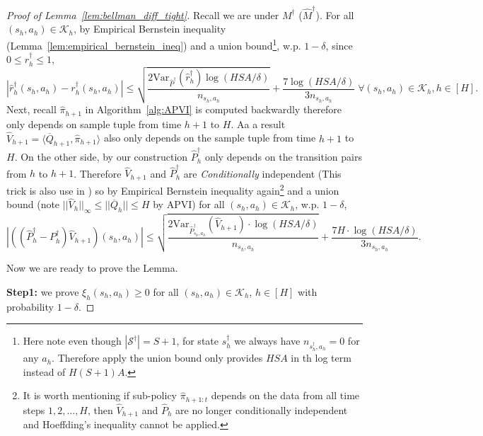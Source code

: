 \begin{proof}[Proof of Lemma~\ref{lem:bellman_diff_tight}]
	Recall we are under $M^\dagger$ ($\widehat{M}^\dagger$). For all $(s_h,a_h)\in\mathcal{K}_h$, by Empirical Bernstein inequality (Lemma~\ref{lem:empirical_bernstein_ineq}) and a union bound\footnote{Here note even though $|\mathcal{S}^\dagger|=S+1$, for state $s^\dagger_h$ we always have $n_{s^\dagger_h,a_h}=0$ for any $a_h$. Therefore apply the union bound only provides $HSA$ in th log term instead of $H(S+1)A$.}, w.p. $1-\delta$, since $0\leq r^\dagger_h\leq 1$,
	\begin{equation}\label{eqn:r_bern}
	|\widehat{r}^\dagger_h(s_h,a_h)-r^\dagger_h(s_h,a_h)|\leq \sqrt{\frac{2\mathrm{Var}_{\widehat{P}^\dagger}(\widehat{r}^\dagger_h)\log(HSA/\delta)}{n_{s_h,a_h}}} +\frac{7\log(HSA/\delta)}{3n_{s_h,a_h}}\;\forall (s_h,a_h)\in\mathcal{K}_h, h\in[H].
	\end{equation}
	Next, recall $\widehat{\pi}_{h+1}$ in Algorithm~\ref{alg:APVI} is computed backwardly therefore only depends on sample tuple from time $h+1$ to $H$. Aa a result $\widehat{V}_{h+1}=\langle \overline{Q}_{h+1}, \widehat{\pi}_{h+1} \rangle$ also only depends on the sample tuple from time $h+1$ to $H$. On the other side, by our construction $\widehat{P}^\dagger_h$ only depends on the transition pairs from $h$ to $h+1$. Therefore $\widehat{V}_{h+1}$ and $\widehat{P}^\dagger_h$ are \emph{Conditionally} independent (This trick is also use in \cite{yin2021near}) so by Empirical Bernstein inequality again\footnote{It is worth mentioning if sub-policy $\widehat{\pi}_{h+1:t}$ depends on the data from all time steps $1,2,\ldots,H$, then $\widehat{V}_{h+1}$ and $\widehat{P}_h$ are no longer conditionally independent and Hoeffding's inequality cannot be applied. }  and a union bound (note $||\widehat{V}_h||_\infty\leq ||\overline{Q}_h||\leq H$ by APVI) for all $(s_h,a_h)\in\mathcal{K}_h$, w.p. $1-\delta$,
	\begin{equation}\label{eqn:v_bern}
	\left|\left((\widehat{P}^\dagger_h-P^\dagger_h)\widehat{V}_{h+1}\right)(s_h,a_h)\right|\leq \sqrt{\frac{2\mathrm{Var}_{\widehat{P}^\dagger_{s_h,a_h}}(\widehat{V}_{h+1})\cdot\log(HSA/\delta)}{n_{s_h,a_h}}}+\frac{7H\cdot\log(HSA/\delta)}{3n_{s_h,a_h}}.
	\end{equation}
	
	

	Now we are ready to prove the Lemma.
	
	\textbf{Step1:} we prove $\xi_h(s_h,a_h)\geq 0$ for all $(s_h,a_h)\in\mathcal{K}_h$, $h\in[H]$ with probability $1-\delta$. 
	

\end{proof}
